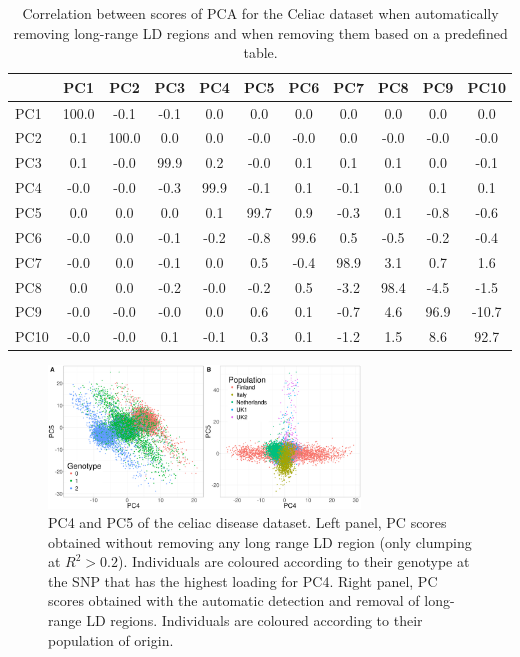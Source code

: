 \documentclass{bioinfo}
\begin{document}
\begin{table}[!tpb]
\centering
\begin{tabular}{l|cccccccccc}
  \hline
 & PC1 & PC2 & PC3 & PC4 & PC5 & PC6 & PC7 & PC8 & PC9 & PC10 \\
  \hline
PC1 & 100.0 & -0.1 & -0.1 & 0.0 & 0.0 & 0.0 & 0.0 & 0.0 & 0.0 & 0.0 \\
  PC2 & 0.1 & 100.0 & 0.0 & 0.0 & -0.0 & -0.0 & 0.0 & -0.0 & -0.0 & -0.0 \\
  PC3 & 0.1 & -0.0 & 99.9 & 0.2 & -0.0 & 0.1 & 0.1 & 0.1 & 0.0 & -0.1 \\
  PC4 & -0.0 & -0.0 & -0.3 & 99.9 & -0.1 & 0.1 & -0.1 & 0.0 & 0.1 & 0.1 \\
  PC5 & 0.0 & 0.0 & 0.0 & 0.1 & 99.7 & 0.9 & -0.3 & 0.1 & -0.8 & -0.6 \\
  PC6 & -0.0 & 0.0 & -0.1 & -0.2 & -0.8 & 99.6 & 0.5 & -0.5 & -0.2 & -0.4 \\
  PC7 & -0.0 & 0.0 & -0.1 & 0.0 & 0.5 & -0.4 & 98.9 & 3.1 & 0.7 & 1.6 \\
  PC8 & 0.0 & 0.0 & -0.2 & -0.0 & -0.2 & 0.5 & -3.2 & 98.4 & -4.5 & -1.5 \\
  PC9 & -0.0 & -0.0 & -0.0 & 0.0 & 0.6 & 0.1 & -0.7 & 4.6 & 96.9 & -10.7 \\
  PC10 & -0.0 & -0.0 & 0.1 & -0.1 & 0.3 & 0.1 & -1.2 & 1.5 & 8.6 & 92.7 \\
   \hline
\end{tabular}
\caption{Correlation between scores of PCA for the Celiac dataset  when automatically removing long-range LD regions and when removing them based on a predefined table.}
\label{tab:pc-celiac}
\end{table}

\begin{figure}[!tpb]
\centerline{\includegraphics[width=235pt]{scores}}
\caption{PC4 and PC5 of the celiac disease dataset. Left panel, PC scores obtained without removing any long range LD region (only clumping at $R^2 > 0.2$). Individuals are coloured according to their genotype at the SNP that has the highest loading for PC4. Right panel, PC scores obtained with the automatic detection and removal of long-range LD regions. Individuals are coloured according to their population of origin.}\label{fig:scores}
\end{figure}
\end{document}
